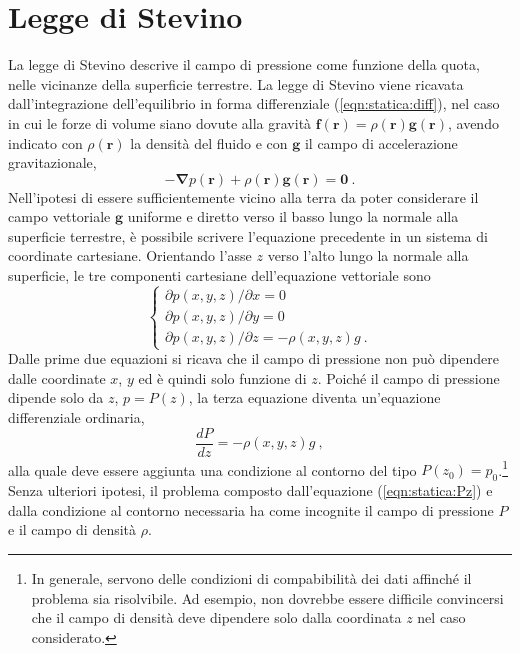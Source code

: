 \section{Legge di Stevino}
La legge di Stevino descrive il campo di pressione come funzione della quota, nelle vicinanze della superficie terrestre. La legge di Stevino viene ricavata dall'integrazione dell'equilibrio in forma differenziale (\ref{eqn:statica:diff}), nel caso in cui le forze di volume siano dovute alla gravità $\bm{f}(\bm{r}) = \rho(\bm{r}) \bm{g}(\bm{r})$, avendo indicato con $\rho(\bm{r})$ la densità del fluido e con $\bm{g}$ il campo di accelerazione gravitazionale,
\begin{equation}\label{eqn:statica:diff:g}
    - \bm{\nabla} p(\bm{r}) + \rho(\bm{r}) \bm{g}(\bm{r}) = \bm{0} \ .
\end{equation}
Nell'ipotesi di essere sufficientemente vicino alla terra da poter considerare il campo vettoriale $\bm{g}$ uniforme e diretto verso il basso lungo la normale alla superficie terrestre, è possibile scrivere l'equazione precedente in un sistema di coordinate cartesiane. Orientando l'asse $z$ verso l'alto lungo la normale alla superficie, le tre componenti cartesiane dell'equazione vettoriale sono
\begin{equation}
\begin{cases}
 \partial p(x,y,z) / \partial x = 0 \\
 \partial p(x,y,z) / \partial y = 0 \\ 
 \partial p(x,y,z) / \partial z = - \rho(x,y,z) g \ .
\end{cases}
\end{equation}
Dalle prime due equazioni si ricava che il campo di pressione non può dipendere dalle coordinate $x$, $y$ ed è quindi solo funzione di $z$. Poiché il campo di pressione dipende solo da $z$, $p = P(z)$, la terza equazione diventa un'equazione differenziale ordinaria,
\begin{equation}\label{eqn:statica:Pz}
  \dfrac{d P}{d z} = -\rho(x,y,z) g \ ,
\end{equation}
alla quale deve essere aggiunta una condizione al contorno del tipo $P(z_0) = p_0$.\footnote{In generale, servono delle condizioni di compabibilità dei dati affinché il problema sia risolvibile. Ad esempio, non dovrebbe essere difficile convincersi che il campo di densità deve dipendere solo dalla coordinata $z$ nel caso considerato.}
Senza ulteriori ipotesi, il problema composto dall'equazione (\ref{eqn:statica:Pz}) e dalla condizione al contorno necessaria ha come incognite il campo di pressione $P$ e il campo di densità $\rho$. 
